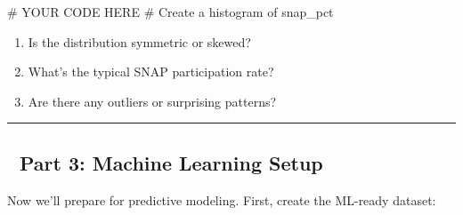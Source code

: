 \documentclass[
  letterpaper,
  DIV=11,
  numbers=noendperiod]{scrartcl}
\newenvironment{Shaded}{\begin{snugshade}}{\end{snugshade}}
\newcommand{\CommentTok}[1]{\textcolor[rgb]{0.37,0.37,0.37}{#1}}
\providecommand{\tightlist}{%
  \setlength{\itemsep}{0pt}\setlength{\parskip}{0pt}}\usepackage{longtable,booktabs,array}
\begin{document}
\begin{Shaded}
\begin{Highlighting}[]
\CommentTok{\# YOUR CODE HERE}
\CommentTok{\# Create a histogram of snap\_pct}
\end{Highlighting}
\end{Shaded}

\begin{tcolorbox}[enhanced jigsaw, title=\textcolor{quarto-callout-note-color}{\faInfo}\hspace{0.5em}{📈 Interpretation Questions}, titlerule=0mm, coltitle=black, colbacktitle=quarto-callout-note-color!10!white, colback=white, left=2mm, toprule=.15mm, opacitybacktitle=0.6, toptitle=1mm, colframe=quarto-callout-note-color-frame, bottomtitle=1mm, arc=.35mm, bottomrule=.15mm, breakable, leftrule=.75mm, opacityback=0, rightrule=.15mm]

\begin{enumerate}
\def\labelenumi{\arabic{enumi}.}
\tightlist
\item
  Is the distribution symmetric or skewed?
\item
  What's the typical SNAP participation rate?
\item
  Are there any outliers or surprising patterns?
\end{enumerate}

\end{tcolorbox}

\begin{center}\rule{0.5\linewidth}{0.5pt}\end{center}

\subsection{🌲 Part 3: Machine Learning
Setup}\label{part-3-machine-learning-setup}

Now we'll prepare for predictive modeling. First, create the ML-ready
dataset:
\end{document}
